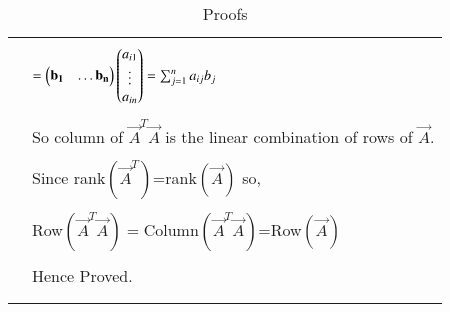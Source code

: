 \documentclass[journal,12pt]{IEEEtran}
\begin{document}
\begin{longtable}{|l|l|}
	&\\
	&$=\begin{pmatrix}\mathbf{b_1}&\hdots\mathbf{b_n}\end{pmatrix}\begin{pmatrix}a_{i1}\\ \vdots \\a_{in}\end{pmatrix}=\sum_{j=1}^{n}a_{ij}b_j$\\
	&\\
	&So column of $\vec{A}^T\vec{A}$ is the linear combination of rows of $\vec{A}$.\\
	&\\
	&Since rank$(\vec{A}^T)$=rank$(\vec{A})$ so,\\
	&\\
	&Row$(\vec{A}^T\vec{A})=$Column$(\vec{A}^T\vec{A})$=Row$(\vec{A})$\\
	&\\
	&Hence Proved.\\

	&\\
\hline
  
    \caption{Proofs}
    \label{table:1}
\end{longtable}
\end{document}
